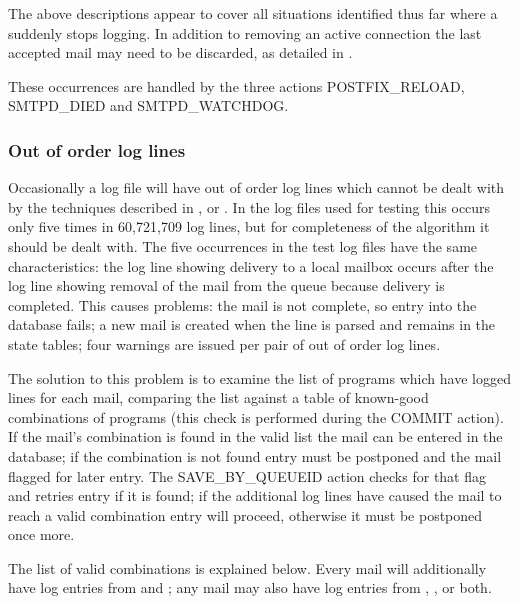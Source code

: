 The above descriptions appear to cover all situations identified thus far
where a  suddenly stops logging.  In addition to removing an
active connection the last accepted mail may need to be discarded, as
detailed in .

These occurrences are handled by the three actions POSTFIX\_RELOAD,
SMTPD\_DIED and SMTPD\_WATCHDOG\@.

\subsubsection{Out of order log lines}

\label{out of order log lines}

Occasionally a log file will have out of order log lines which cannot be
dealt with by the techniques described in ,  or .  In the \numberOFlogFILES{} log files used for testing this
occurs only five times in 60,721,709 log lines, but for completeness of the
algorithm it should be dealt with.  The five occurrences in the test log
files have the same characteristics: the  log line showing
delivery to a local mailbox occurs after the  log line showing
removal of the mail from the queue because delivery is completed.  This
causes problems: the mail is not complete, so entry into the database
fails; a new mail is created when the  line is parsed and
remains in the state tables; four warnings are issued per pair of out of
order log lines.

The solution to this problem is to examine the list of programs which have
logged lines for each mail, comparing the list against a table of
known-good combinations of programs (this check is performed during the
COMMIT action).  If the mail's combination is found in the valid list the
mail can be entered in the database; if the combination is not found entry
must be postponed and the mail flagged for later entry.  The
SAVE\_BY\_QUEUEID action checks for that flag and retries entry if it is
found; if the additional log lines have caused the mail to reach a valid
combination entry will proceed, otherwise it must be postponed once more.

The list of valid combinations is explained below.  Every mail will
additionally have log entries from  and ; any
mail may also have log entries from , , or
both.

